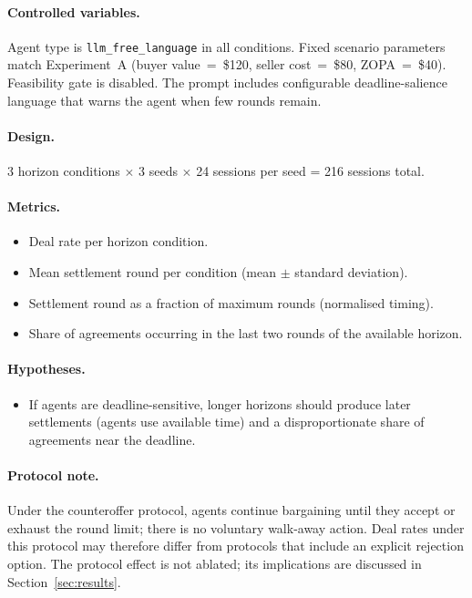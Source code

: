 \paragraph{Controlled variables.}
Agent type is \texttt{llm\_free\_language} in all conditions.  Fixed scenario parameters match Experiment~A (buyer value~=~\$120, seller cost~=~\$80, ZOPA~=~\$40).  Feasibility gate is disabled.  The prompt includes configurable deadline-salience language that warns the agent when few rounds remain.

\paragraph{Design.}
3 horizon conditions $\times$ 3 seeds $\times$ 24 sessions per seed = 216 sessions total.

\paragraph{Metrics.}
\begin{itemize}
    \item Deal rate per horizon condition.
    \item Mean settlement round per condition (mean $\pm$ standard deviation).
    \item Settlement round as a fraction of maximum rounds (normalised timing).
    \item Share of agreements occurring in the last two rounds of the available horizon.
\end{itemize}

\paragraph{Hypotheses.}
\begin{itemize}
    \item[\textbf{H-C1.}] If agents are deadline-sensitive, longer horizons should produce later settlements (agents use available time) and a disproportionate share of agreements near the deadline.
\end{itemize}

\paragraph{Protocol note.}
Under the counteroffer protocol, agents continue bargaining until they accept or exhaust the round limit; there is no voluntary walk-away action.  Deal rates under this protocol may therefore differ from protocols that include an explicit rejection option.  The protocol effect is not ablated; its implications are discussed in Section~\ref{sec:results}.

